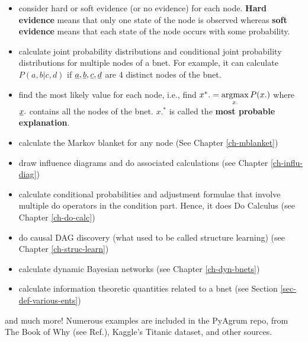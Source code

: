 \begin{itemize}

\item consider hard or soft evidence (or no evidence)
for each node. {\bf Hard evidence} means that only
one state of the node is observed whereas {\bf soft
evidence} means that each state of the node occurs with some probability.


\item calculate joint probability distributions and
conditional joint probability distributions for multiple nodes of a bnet.
For example, it can calculate  $P(a,b|c,d)$ if $\rva, \rvb, \rvc, \rvd$ 
are 4  distinct nodes of the bnet.


\item find
the most likely value for each node, i.e., find
 $x^*.=\mathop{\mathrm{argmax}}\limits_{x.}P(x.)$ where $\rvx.$ contains
 all the nodes of the bnet. $x.^*$ is called
 the {\bf most probable explanation}.


\item calculate the Markov blanket for any node
(See Chapter \ref{ch-mblanket})

\item draw influence diagrams and do associated calculations
(see Chapter \ref{ch-influ-diag})

\item calculate conditional probabilities and adjustment formulae
 that involve multiple do operators in the condition part.
Hence, it does Do Calculus (see Chapter \ref{ch-do-calc})

\item do causal DAG discovery (what used to be called structure learning)
(see Chapter \ref{ch-struc-learn})

\item calculate dynamic Bayesian networks (see Chapter \ref{ch-dyn-bnets})

\item calculate information theoretic quantities related
to a bnet (see Section \ref{sec-def-various-ents})


\end{itemize}
and much more! Numerous examples are included in the 
PyAgrum repo, from The Book of Why (see Ref.\cite{book-why}),
Kaggle's Titanic dataset, and other sources.

